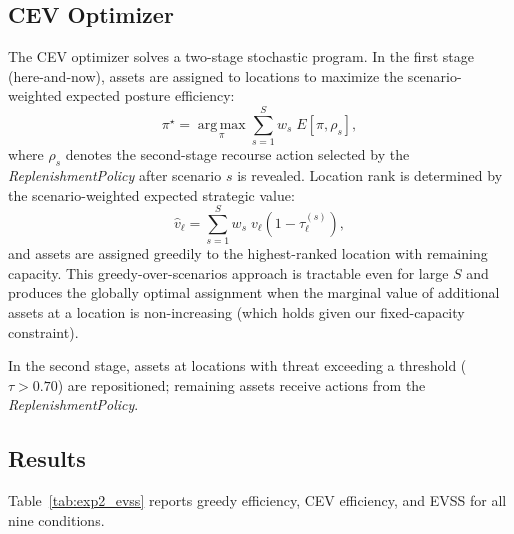 \documentclass[11pt]{article}
\begin{document}
\subsection{CEV Optimizer}
\label{sec:exp2:algorithm}

The CEV optimizer solves a two-stage stochastic program.
In the first stage (here-and-now), assets are assigned to locations to
maximize the scenario-weighted expected posture efficiency:
\begin{equation}
    \pi^\star = \operatorname*{arg\,max}_{\pi}
    \sum_{s=1}^{S} w_s \; E\!\left[\pi, \rho_s\right],
    \label{eq:cev}
\end{equation}
where $\rho_s$ denotes the second-stage recourse action selected by the
\emph{ReplenishmentPolicy} after scenario $s$ is revealed.
Location rank is determined by the scenario-weighted expected strategic
value:
\begin{equation}
    \hat{v}_\ell = \sum_{s=1}^{S} w_s \; v_\ell
    \left(1 - \tau_\ell^{(s)}\right),
    \label{eq:weighted_value}
\end{equation}
and assets are assigned greedily to the highest-ranked location with
remaining capacity.  This greedy-over-scenarios approach is tractable
even for large $S$ and produces the globally optimal assignment when
the marginal value of additional assets at a location is non-increasing
(which holds given our fixed-capacity constraint).

In the second stage, assets at locations with threat exceeding a
threshold ($\tau > 0.70$) are repositioned; remaining assets receive
actions from the \emph{ReplenishmentPolicy}.

\subsection{Results}
\label{sec:exp2:results}

Table~\ref{tab:exp2_evss} reports greedy efficiency, CEV efficiency, and
EVSS for all nine conditions.
\end{document}
